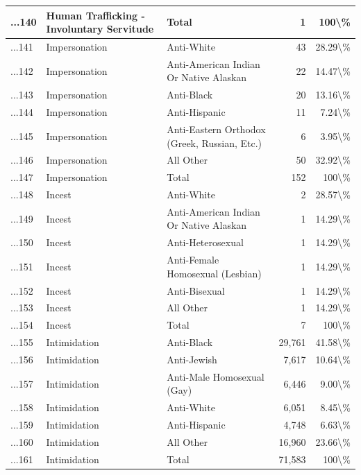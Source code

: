 \documentclass[
]{krantz}
\begin{document}
\begin{longtable}[t]{l|l|l|r|r}
\hline
...140 & Human Trafficking - Involuntary Servitude & Total & 1 & 100\textbackslash{}\%\\
\hline
...141 & Impersonation & Anti-White & 43 & 28.29\textbackslash{}\%\\
\hline
...142 & Impersonation & Anti-American Indian Or Native Alaskan & 22 & 14.47\textbackslash{}\%\\
\hline
...143 & Impersonation & Anti-Black & 20 & 13.16\textbackslash{}\%\\
\hline
...144 & Impersonation & Anti-Hispanic & 11 & 7.24\textbackslash{}\%\\
\hline
...145 & Impersonation & Anti-Eastern Orthodox (Greek, Russian, Etc.) & 6 & 3.95\textbackslash{}\%\\
\hline
...146 & Impersonation & All Other & 50 & 32.92\textbackslash{}\%\\
\hline
...147 & Impersonation & Total & 152 & 100\textbackslash{}\%\\
\hline
...148 & Incest & Anti-White & 2 & 28.57\textbackslash{}\%\\
\hline
...149 & Incest & Anti-American Indian Or Native Alaskan & 1 & 14.29\textbackslash{}\%\\
\hline
...150 & Incest & Anti-Heterosexual & 1 & 14.29\textbackslash{}\%\\
\hline
...151 & Incest & Anti-Female Homosexual (Lesbian) & 1 & 14.29\textbackslash{}\%\\
\hline
...152 & Incest & Anti-Bisexual & 1 & 14.29\textbackslash{}\%\\
\hline
...153 & Incest & All Other & 1 & 14.29\textbackslash{}\%\\
\hline
...154 & Incest & Total & 7 & 100\textbackslash{}\%\\
\hline
...155 & Intimidation & Anti-Black & 29,761 & 41.58\textbackslash{}\%\\
\hline
...156 & Intimidation & Anti-Jewish & 7,617 & 10.64\textbackslash{}\%\\
\hline
...157 & Intimidation & Anti-Male Homosexual (Gay) & 6,446 & 9.00\textbackslash{}\%\\
\hline
...158 & Intimidation & Anti-White & 6,051 & 8.45\textbackslash{}\%\\
\hline
...159 & Intimidation & Anti-Hispanic & 4,748 & 6.63\textbackslash{}\%\\
\hline
...160 & Intimidation & All Other & 16,960 & 23.66\textbackslash{}\%\\
\hline
...161 & Intimidation & Total & 71,583 & 100\textbackslash{}\%\\

\end{longtable}
\end{document}
